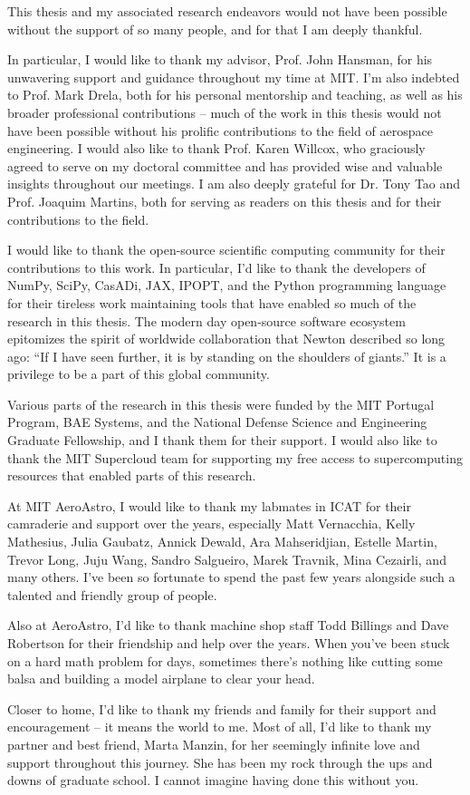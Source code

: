 This thesis and my associated research endeavors would not have been possible without the support of so many people, and for that I am deeply thankful.

In particular, I would like to thank my advisor, Prof. John Hansman, for his unwavering support and guidance throughout my time at MIT. I'm also indebted to Prof. Mark Drela, both for his personal mentorship and teaching, as well as his broader professional contributions -- much of the work in this thesis would not have been possible without his prolific contributions to the field of aerospace engineering. I would also like to thank Prof. Karen Willcox, who graciously agreed to serve on my doctoral committee and has provided wise and valuable insights throughout our meetings. I am also deeply grateful for Dr. Tony Tao and Prof. Joaquim Martins, both for serving as readers on this thesis and for their contributions to the field.

I would like to thank the open-source scientific computing community for their contributions to this work. In particular, I'd like to thank the developers of NumPy, SciPy, CasADi, JAX, IPOPT, and the Python programming language for their tireless work maintaining tools that have enabled so much of the research in this thesis. The modern day open-source software ecosystem epitomizes the spirit of worldwide collaboration that Newton described so long ago: ``If I have seen further, it is by standing on the shoulders of giants.'' It is a privilege to be a part of this global community.

Various parts of the research in this thesis were funded by the MIT Portugal Program, BAE Systems, and the National Defense Science and Engineering Graduate Fellowship, and I thank them for their support. I would also like to thank the MIT Supercloud team for supporting my free access to supercomputing resources that enabled parts of this research.

At MIT AeroAstro, I would like to thank my labmates in ICAT for their camraderie and support over the years, especially Matt Vernacchia, Kelly Mathesius, Julia Gaubatz, Annick Dewald, Ara Mahseridjian, Estelle Martin, Trevor Long, Juju Wang, Sandro Salgueiro, Marek Travnik, Mina Cezairli, and many others. I've been so fortunate to spend the past few years alongside such a talented and friendly group of people.

Also at AeroAstro, I'd like to thank machine shop staff Todd Billings and Dave Robertson for their friendship and help over the years. When you've been stuck on a hard math problem for days, sometimes there's nothing like cutting some balsa and building a model airplane to clear your head.

Closer to home, I'd like to thank my friends and family for their support and encouragement -- it means the world to me. Most of all, I'd like to thank my partner and best friend, Marta Manzin, for her seemingly infinite love and support throughout this journey. She has been my rock through the ups and downs of graduate school. I cannot imagine having done this without you.